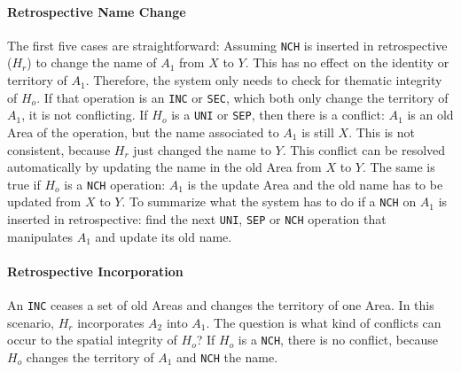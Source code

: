 
\paragraph{Retrospective Name Change} %
\label{par:retrospective_name_change}

The first five cases are straightforward: Assuming \texttt{NCH} is inserted in retrospective ($H_r$) to change the name of $A_1$ from $X$ to $Y$. This has no effect on the identity or territory of $A_1$. Therefore, the system only needs to check for thematic integrity of $H_o$. If that operation is an \texttt{INC} or \texttt{SEC}, which both only change the territory of $A_1$, it is not conflicting. If $H_o$ is a \texttt{UNI} or \texttt{SEP}, then there is a conflict: $A_1$ is an old Area of the operation, but the name associated to $A_1$ is still $X$. This is not consistent, because $H_r$ just changed the name to $Y$. This conflict can be resolved automatically by updating the name in the old Area from $X$ to $Y$. The same is true if $H_o$ is a \texttt{NCH} operation: $A_1$ is the update Area and the old name has to be updated from $X$ to $Y$. To summarize what the system has to do if a \texttt{NCH} on $A_1$ is inserted in retrospective: find the next \texttt{UNI}, \texttt{SEP} or \texttt{NCH} operation that manipulates $A_1$ and update its old name.


\paragraph{Retrospective Incorporation} %
\label{par:retrospective_incorporation}

An \texttt{INC} ceases a set of old Areas and changes the territory of one Area. In this scenario, $H_r$ incorporates $A_2$ into $A_1$. The question is what kind of conflicts can occur to the spatial integrity of $H_o$? If $H_o$ is  a \texttt{NCH}, there is no conflict, because $H_o$ changes the territory of $A_1$ and \texttt{NCH} the name.

